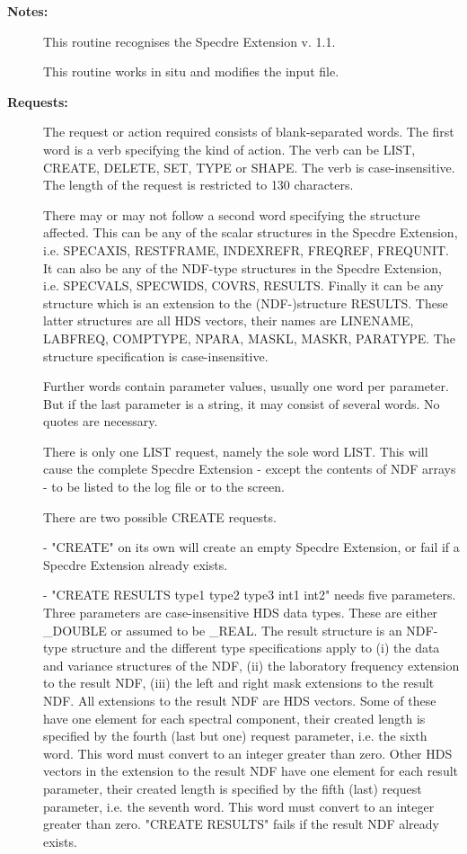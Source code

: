\begin{description}
\item [{\bf Notes:}]
This routine recognises the Specdre Extension v. 1.1.

This routine works in situ and modifies the input file.

\item [{\bf Requests:}]
   The request or action required consists of blank-separated
   words. The first word is a verb specifying the kind of action.
   The verb can be LIST, CREATE, DELETE, SET, TYPE or SHAPE. The
   verb is case-insensitive. The length of the request is
   restricted to 130 characters.

   There may or may not follow a second word specifying the
   structure affected. This can be any of the scalar structures in
   the Specdre Extension, i.e. SPECAXIS, RESTFRAME, INDEXREFR,
   FREQREF, FREQUNIT. It can also be any of the NDF-type structures
   in the Specdre Extension, i.e. SPECVALS, SPECWIDS, COVRS, RESULTS.
   Finally it can be any structure which is an extension to the
   (NDF-)structure RESULTS. These latter structures are all HDS
   vectors, their names are LINENAME, LABFREQ, COMPTYPE, NPARA,
   MASKL, MASKR, PARATYPE. The structure specification is
   case-insensitive.

   Further words contain parameter values, usually one word per
   parameter. But if the last parameter is a string, it may
   consist of several words. No quotes are necessary.

   There is only one LIST request, namely the sole word LIST. This
   will cause the complete Specdre Extension - except the contents of
   NDF arrays - to be listed to the log file or to the screen.

   There are two possible CREATE requests.

   -  "CREATE" on its own will create an empty Specdre Extension,
      or fail if a Specdre Extension already exists.

   -  "CREATE RESULTS type1 type2 type3 int1 int2" needs five
      parameters. Three parameters are case-insensitive HDS data
      types. These are either _DOUBLE or assumed to be _REAL. The
      result structure is an NDF-type structure and the different
      type specifications apply to (i) the data and variance
      structures of the NDF, (ii) the laboratory frequency
      extension to the result NDF, (iii) the left and right mask
      extensions to the result NDF. All extensions to the result
      NDF are HDS vectors. Some of these have one element for
      each spectral component, their created length is specified
      by the fourth (last but one) request parameter, i.e. the
      sixth word. This word must convert to an integer greater
      than zero. Other HDS vectors in the extension to the result
      NDF have one element for each result parameter, their
      created length is specified by the fifth (last) request
      parameter, i.e. the seventh word. This word must convert to
      an integer greater than zero. "CREATE RESULTS" fails if the
      result NDF already exists.


\end{description}
